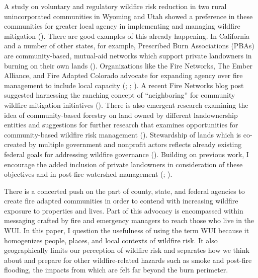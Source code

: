 \documentclass[
]{article}
\begin{document}
A study on voluntary and regulatory wildfire risk reduction in two rural unincorporated communities in Wyoming and Utah showed a preference in these communities for greater local agency in implementing and managing wildfire mitigation (). There are good examples of this already happening. In California and a number of other states, for example, Prescribed Burn Associations (PBAs) are community-based, mutual-aid networks which support private landowners in burning on their own lands (). Organizations like the Fire Networks, The Ember Alliance, and Fire Adapted Colorado advocate for expanding agency over fire management to include local capacity (; ; ). A recent Fire Networks blog post suggested harnessing the ranching concept of ``neighboring'' for community wildfire mitigation initiatives (). There is also emergent research examining the idea of community-based forestry on land owned by different landownership entities and suggestions for further research that examines opportunities for community-based wildfire risk management (). Stewardship of lands which is co-created by multiple government and nonprofit actors reflects already existing federal goals for addressing wildfire governance (). Building on previous work, I encourage the added inclusion of private landowners in consideration of these objectives and in post-fire watershed management (; ).

There is a concerted push on the part of county, state, and federal agencies to create fire adapted communities in order to contend with increasing wildfire exposure to properties and lives. Part of this advocacy is encompassed within messaging crafted by fire and emergency managers to reach those who live in the WUI. In this paper, I question the usefulness of using the term WUI because it homogenizes people, places, and local contexts of wildfire risk. It also geographically limits our perception of wildfire risk and separates how we think about and prepare for other wildfire-related hazards such as smoke and post-fire flooding, the impacts from which are felt far beyond the burn perimeter.
\end{document}
